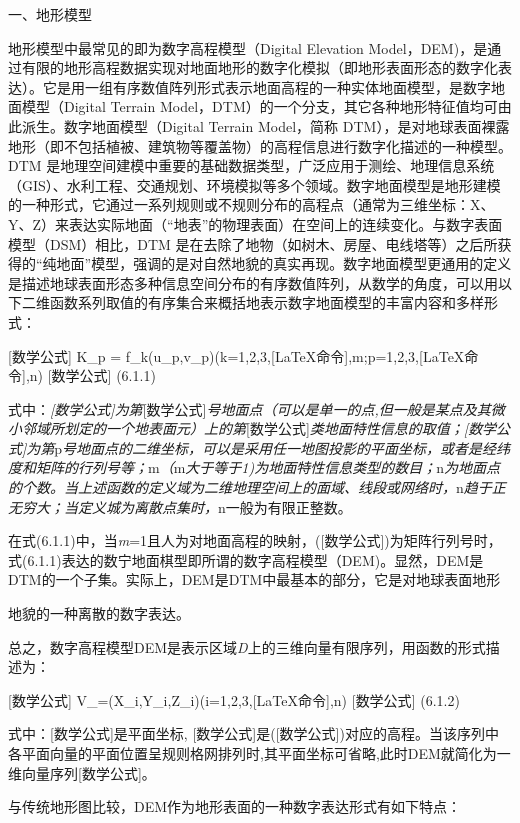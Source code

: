 一、地形模型

地形模型中最常见的即为数字高程模型（Digital Elevation Model，DEM)，是通过有限的地形高程数据实现对地面地形的数字化模拟（即地形表面形态的数字化表达）。它是用一组有序数值阵列形式表示地面高程的一种实体地面模型，是数字地面模型（Digital Terrain Model，DTM）的一个分支，其它各种地形特征值均可由此派生。数字地面模型（Digital Terrain Model，简称 DTM），是对地球表面裸露地形（即不包括植被、建筑物等覆盖物）的高程信息进行数字化描述的一种模型。DTM 是地理空间建模中重要的基础数据类型，广泛应用于测绘、地理信息系统（GIS）、水利工程、交通规划、环境模拟等多个领域。数字地面模型是地形建模的一种形式，它通过一系列规则或不规则分布的高程点（通常为三维坐标：X、Y、Z）来表达实际地面（``地表''的物理表面）在空间上的连续变化。与数字表面模型（DSM）相比，DTM 是在去除了地物（如树木、房屋、电线塔等）之后所获得的``纯地面''模型，强调的是对自然地貌的真实再现。数字地面模型更通用的定义是描述地球表面形态多种信息空间分布的有序数值阵列，从数学的角度，可以用以下二维函数系列取值的有序集合来概括地表示数字地面模型的丰富内容和多样形式：

{[}数学公式{]} K\_p = f\_k(u\_p,v\_p)(k=1,2,3,{[}LaTeX命令{]},m;p=1,2,3,{[}LaTeX命令{]},n) {[}数学公式{]} (6.1.1)

式中：\emph{{[}数学公式{]}为第}{[}数学公式{]}\emph{号地面点（可以是单一的点,但一般是某点及其微小邻域所划定的一个地表面元）上的第}{[}数学公式{]}\emph{类地面特性信息的取值；{[}数学公式{]}为第}p\emph{号地面点的二维坐标，可以是采用任一地图投影的平面坐标，或者是经纬度和矩阵的行列号等；}m\emph{（}m\emph{大于等于1)为地面特性信息类型的数目；}n\emph{为地面点的个数。当上述函数的定义域为二维地理空间上的面域、线段或网络时，}n\emph{趋于正无穷大；当定义城为离散点集时，}n一般为有限正整数。

在式(6.1.1)中，当\emph{m}=1且人为对地面高程的映射，({[}数学公式{]})为矩阵行列号时，式(6.1.1)表达的数宁地面棋型即所谓的数字高程模型（DEM)。显然，DEM是DTM的一个子集。实际上，DEM是DTM中最基本的部分，它是对地球表面地形

地貌的一种离散的数字表达。

总之，数字高程模型DEM是表示区域\emph{D}上的三维向量有限序列，用函数的形式描述为：

{[}数学公式{]} V\_=(X\_i,Y\_i,Z\_i)(i=1,2,3,{[}LaTeX命令{]},n) {[}数学公式{]} (6.1.2)

式中：{[}数学公式{]}是平面坐标, {[}数学公式{]}是({[}数学公式{]})对应的高程。当该序列中各平面向量的平面位置呈规则格网排列时,其平面坐标可省略,此时DEM就简化为一维向量序列{[}数学公式{]}。

与传统地形图比较，DEM作为地形表面的一种数字表达形式有如下特点：

